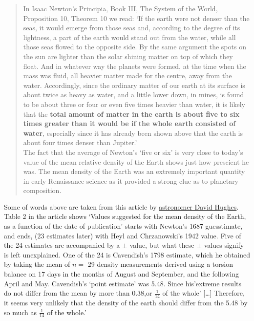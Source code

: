 \documentclass[]{book}
\begin{document}
\begin{quote}
In Isaac Newton's Principia, Book III, The System of the World, Proposition 10, Theorem 10 we read: `If the earth were not denser than the seas, it would emerge from those seas and, according to the degree of its lightness, a part of the earth would stand out from the water, while all those seas flowed to the opposite side. By the same argument the spots on the sun are lighter than the solar shining matter on top of which they float. And in whatever way the planets were formed, at the time when the mass was fluid, all heavier matter made for the centre, away from the water. Accordingly, since the ordinary matter of our earth at its surface is about twice as heavy as water, and a little lower down, in mines, is found to be about three or four or even five times heavier than water, it is likely that the \textbf{total amount of matter in the earth is about five to six times greater than it would be if the whole earth consisted of water}, especially since it has already been shown above that the earth is about four times denser than Jupiter.'\\
\hspace*{0.333em}\hspace*{0.333em}\hspace*{0.333em}\hspace*{0.333em}The fact that the average of Newton's `five or six' is very close to today's value of the mean relative density of the Earth shows just how prescient he was. The mean density of the Earth was an extremely important quantity in early Renaissance science as it provided a strong clue as to planetary composition.
\end{quote}

Some of words above are taken from this article by \href{http://www.biostat.mcgill.ca/hanley/statbook/DensityOfEarth.pdf}{astronomer David Hughes}.
Table 2 in the article shows `Values suggested for the mean density of the Earth, as a function of the date of publication' starts with Newton's 1687 guesstimate, and ends, (23 estimates later) with Heyl and Chrzanowski's 1942 value.
Five of the 24 estimates are accompanied by a \(\pm\) value, but what these \(\pm\) values signify is left unexplained. One of the 24 is Cavendish's 1798 estimate, which he obtained by taking the mean of \(n =\) 29 density measurements derived using a torsion balance on 17 days in the months of August and September, and the following April and May. Cavendish's `point estimate' was 5.48. Since his'extreme results do not differ from the mean by more than 0.38,or \(\frac{1}{14}\) of the whole' {[}\ldots{}{]} Therefore, it seems very unlikely that the density of the earth should differ from the 5.48 by so much as \(\frac{1}{14}\) of the whole.'
\end{document}

